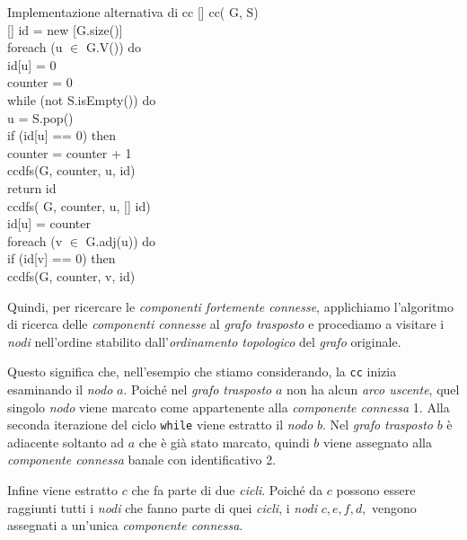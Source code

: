 \begin{code}{Implementazione alternativa di cc}
\noindent\rmbreak\ind{}[] cc( G,  S)\\
    [] id = new [G.size()]\\
    \ind foreach (u $\in$ G.V()) do\\
        \indf id[u] = 0\\
    \ind{} counter = 0\\
    while (not S.isEmpty()) do\\
        \indf{} u = S.pop()\\
        if (id[u] == 0) then\\
            \indff counter = counter + 1\\
            ccdfs(G, counter, u, id)\\
    \ind return id\\

\nl{}
\rmbreak\ind ccdfs( G,  counter,  u, [] id)\\
    id[u] = counter\\
    \ind foreach (v $\in$ G.adj(u)) do\\
        \indf if (id[v] == 0) then\\
            \indff ccdfs(G, counter, v, id)
\end{code}\noindent
Quindi, per ricercare le \emph{componenti fortemente connesse}, applichiamo
l'algoritmo di ricerca delle \emph{componenti connesse} al \emph{grafo trasposto}
e procediamo a visitare i \emph{nodi} nell'ordine stabilito
dall'\emph{ordinamento topologico} del \emph{grafo} originale.

Questo significa che, nell'esempio che stiamo considerando, la \texttt{cc}
inizia esaminando il \emph{nodo} $a$. Poiché nel \emph{grafo trasposto} $a$
non ha alcun \emph{arco uscente}, quel singolo \emph{nodo} viene marcato come
appartenente alla \emph{componente connessa} 1. Alla seconda iterazione del
ciclo \texttt{while} viene estratto il \emph{nodo} $b$. Nel \emph{grafo
trasposto} $b$ è adiacente soltanto ad $a$ che è già stato marcato, quindi
$b$ viene assegnato alla \emph{componente connessa} banale con identificativo 2.

Infine viene estratto $c$ che fa parte di due \emph{cicli}. Poiché da $c$ possono
essere raggiunti tutti i \emph{nodi} che fanno parte di quei \emph{cicli}, i
\emph{nodi} $c,e,f,d,$ vengono assegnati a un'unica \emph{componente connessa}.

